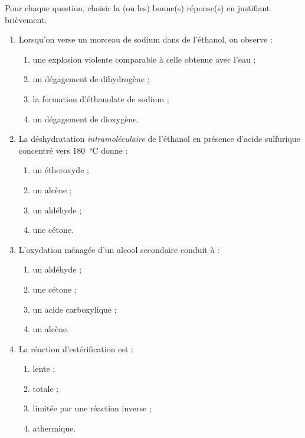 \documentclass[11pt]{article}
\begin{document}
\begin{exercice}
Pour chaque question, choisir la (ou les) bonne(s) réponse(s) en justifiant brièvement.
\begin{enumerate}
\item Lorsqu'on verse un morceau de sodium dans de l'éthanol, on observe :
\begin{enumerate}
\item une explosion violente comparable à celle obtenue avec l'eau ;
\item un dégagement de dihydrogène ;
\item la formation d'éthanolate de sodium  ;
\item un dégagement de dioxygène.
\end{enumerate}
\item La déshydratation \emph{intramoléculaire} de l'éthanol en présence d'acide sulfurique concentré vers \SI{180}{\celsius} donne :
\begin{enumerate}
\item un étheroxyde ; \item un alcène ; \item un aldéhyde ; \item une cétone.
\end{enumerate}
\item L'oxydation ménagée d'un alcool secondaire conduit à :
\begin{enumerate}
\item un aldéhyde ; \item une cétone ; \item un acide carboxylique ; \item un alcène.
\end{enumerate}
\item La réaction d'estérification est :
\begin{enumerate}
\item lente ; \item totale ; \item limitée par une réaction inverse ; \item athermique.
\end{enumerate}
\end{enumerate}
\end{exercice}
\end{document}
